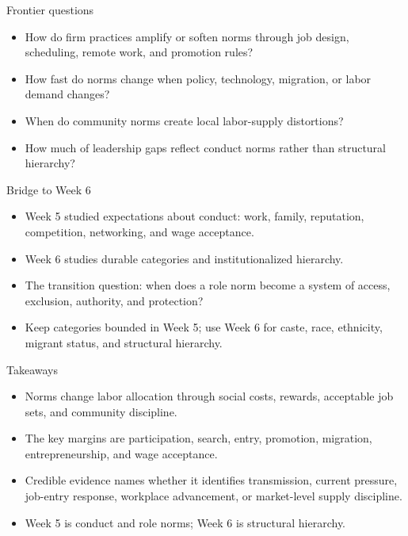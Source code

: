 \documentclass[aspectratio=169,11pt]{beamer}
\begin{document}
\begin{frame}{Frontier questions}
\begin{itemize}
    \item How do firm practices amplify or soften norms through job design, scheduling, remote work, and promotion rules?
    \item How fast do norms change when policy, technology, migration, or labor demand changes?
    \item When do community norms create local labor-supply distortions?
    \item How much of leadership gaps reflect conduct norms rather than structural hierarchy?
\end{itemize}
\end{frame}

\begin{frame}{Bridge to Week 6}
\begin{itemize}
    \item Week 5 studied expectations about conduct: work, family, reputation, competition, networking, and wage acceptance.
    \item Week 6 studies durable categories and institutionalized hierarchy.
    \item The transition question: when does a role norm become a system of access, exclusion, authority, and protection?
    \item Keep categories bounded in Week 5; use Week 6 for caste, race, ethnicity, migrant status, and structural hierarchy.
\end{itemize}
\end{frame}

\begin{frame}{Takeaways}
\begin{itemize}
    \item Norms change labor allocation through social costs, rewards, acceptable job sets, and community discipline.
    \item The key margins are participation, search, entry, promotion, migration, entrepreneurship, and wage acceptance.
    \item Credible evidence names whether it identifies transmission, current pressure, job-entry response, workplace advancement, or market-level supply discipline.
    \item Week 5 is conduct and role norms; Week 6 is structural hierarchy.
\end{itemize}
\end{frame}
\end{document}
